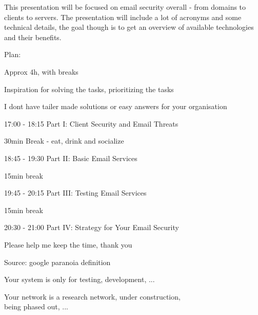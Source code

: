 \documentclass[Screen16to9,17pt]{foils}
\begin{document}




This presentation will be focused on email security overall - from domains to clients to servers. The presentation will include a lot of acronyms and some technical details, the goal though is to get an overview of available technologies and their benefits.




\begin{list2}
\item Plan:
\item Approx 4h, with breaks
\item Inspiration for solving the tasks, prioritizing the tasks
\item I dont have tailer made solutions or easy answers for your organisation
\end{list2}


\begin{list2}
\item[\faClockO] 17:00 - 18:15 Part I: Client Security and Email Threats
\item 30min Break - eat, drink and socialize
\item[\faClockO] 18:45 - 19:30 Part II: Basic Email Services
\item 15min break
\item[\faClockO] 19:45 - 20:15 Part III: Testing Email Services
\item 15min break
\item[\faClockO] 20:30 - 21:00 Part IV: Strategy for Your Email Security
\end{list2}

Please help me keep the time, thank you \smiley




Source: google paranoia definition




Your system is only for testing, development, ...

Your network is a research network, under construction, \\
being phased out, ...
\end{document}
